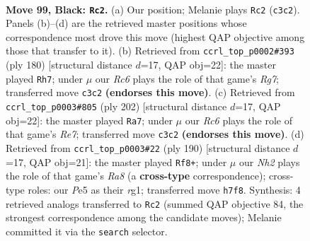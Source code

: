 \documentclass[11pt]{article}
\begin{document}
\clearpage

\begin{figure}[p]\centering
\begin{subfigure}{0.46\textwidth}\centering
\resizebox{\linewidth}{!}{%
\newchessgame
\chessboard[
  setfen={R7/7n/7p/4p2k/1K1p3b/2r5/8/8 b - - 17 99},
  showmover=false,
  pgfstyle=straightmove, color=movearrow, markmove={c3-c2}
]}
\caption{}
\end{subfigure}\hfill
\begin{subfigure}{0.46\textwidth}\centering
\resizebox{\linewidth}{!}{%
\newchessgame
\chessboard[
  setfen={5k2/6R1/5P2/5K2/5P2/8/8/3r4 w - - 23 91},
  showmover=false,
  pgfstyle=straightmove, color=movearrow, markmove={g7-h7}
]}
\caption{}
\end{subfigure}
\\[4pt]
\begin{subfigure}{0.46\textwidth}\centering
\resizebox{\linewidth}{!}{%
\newchessgame
\chessboard[
  setfen={5k2/4R3/5P2/5K2/5P2/2r5/8/8 w - - 47 102},
  showmover=false,
  pgfstyle=straightmove, color=movearrow, markmove={e7-a7}
]}
\caption{}
\end{subfigure}\hfill
\begin{subfigure}{0.46\textwidth}\centering
\resizebox{\linewidth}{!}{%
\newchessgame
\chessboard[
  setfen={R7/8/2r2k2/4R3/5P2/5K2/5P2/6r1 w - - 43 96},
  showmover=false,
  pgfstyle=straightmove, color=movearrow, markmove={a8-f8}
]}
\caption{}
\end{subfigure}
\caption{\textbf{Move 99, Black: \texttt{Rc2}.} (a) Our position; Melanie plays \texttt{Rc2} (\texttt{c3c2}). Panels (b)--(d) are the retrieved master positions whose correspondence most drove this move (highest QAP objective among those that transfer to it). (b) Retrieved from \texttt{ccrl\_top\_p0002\#393} (ply 180) [structural distance $d$=17, QAP obj=22]: the master played \texttt{Rh7}; under $\mu$ our \emph{Rc6} plays the role of that game's \emph{Rg7}; transferred move \texttt{c3c2} \textbf{(endorses this move)}. (c) Retrieved from \texttt{ccrl\_top\_p0003\#805} (ply 202) [structural distance $d$=17, QAP obj=22]: the master played \texttt{Ra7}; under $\mu$ our \emph{Rc6} plays the role of that game's \emph{Re7}; transferred move \texttt{c3c2} \textbf{(endorses this move)}. (d) Retrieved from \texttt{ccrl\_top\_p0003\#22} (ply 190) [structural distance $d$=17, QAP obj=21]: the master played \texttt{Rf8+}; under $\mu$ our \emph{Nh2} plays the role of that game's \emph{Ra8} (a \textbf{cross-type} correspondence); cross-type roles: our \emph{P}e5 as their \emph{r}g1; transferred move \texttt{h7f8}. Synthesis: 4 retrieved analogs transferred to \texttt{Rc2} (summed QAP objective 84, the strongest correspondence among the candidate moves); Melanie committed it via the \texttt{search} selector.}
\label{fig:thought-m197}
\end{figure}
\end{document}
